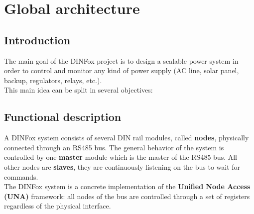 \section{Global architecture}

\subsection{Introduction}

The main goal of the DINFox project is to design a scalable power system in order to control and monitor any kind of power supply (AC line, solar panel, backup, regulators, relays, etc.).
\medskip \\
This main idea can be split in several objectives:


\subsection{Functional description}

A DINFox system consists of several DIN rail modules, called \textbf{nodes}, physically connected through an RS485 bus. The general behavior of the system is controlled by one \textbf{master} module which is the master of the RS485 bus. All other nodes are \textbf{slaves}, they are continuously listening on the bus to wait for commands.
\medskip \\
The DINFox system is a concrete implementation of the \textbf{Unified Node Access (UNA)} framework: all nodes of the bus are controlled through a set of registers regardless of the physical interface.
\bigskip

\begin{figure}[h]
    \centering
    \vspace*{\baselineskip}
\end{figure}

\newpage